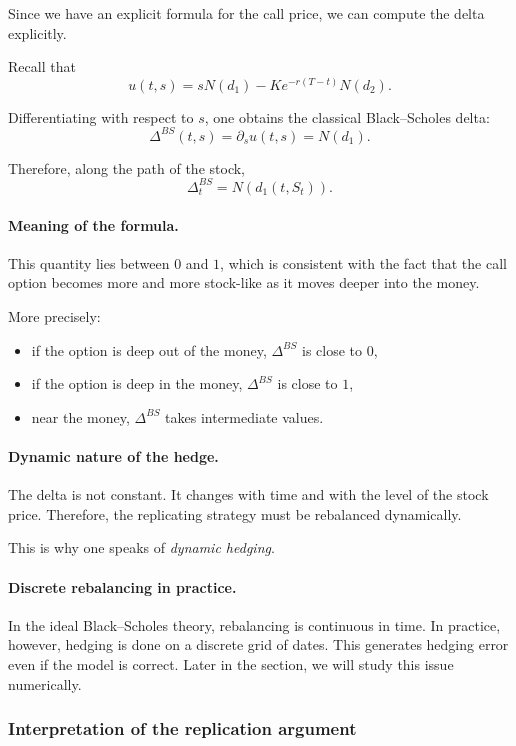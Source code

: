 \documentclass[11pt]{article}
\theoremstyle{plain}
\theoremstyle{definition}
\theoremstyle{remark}
\begin{document}
Since we have an explicit formula for the call price, we can compute the
delta explicitly.

Recall that
\[
u(t,s)=sN(d_1)-Ke^{-r(T-t)}N(d_2).
\]

Differentiating with respect to \(s\), one obtains the classical
Black--Scholes delta:
\[
\boxed{
\Delta^{BS}(t,s)=\partial_s u(t,s)=N(d_1).
}
\]

Therefore, along the path of the stock,
\[
\boxed{
\Delta_t^{BS}=N(d_1(t,S_t)).
}
\]

\paragraph{Meaning of the formula.}
This quantity lies between \(0\) and \(1\), which is consistent with the
fact that the call option becomes more and more stock-like as it moves
deeper into the money.

More precisely:
\begin{itemize}[leftmargin=1.4em]
    \item if the option is deep out of the money, \(\Delta^{BS}\) is
    close to \(0\),
    \item if the option is deep in the money, \(\Delta^{BS}\) is close
    to \(1\),
    \item near the money, \(\Delta^{BS}\) takes intermediate values.
\end{itemize}

\paragraph{Dynamic nature of the hedge.}
The delta is not constant.
It changes with time and with the level of the stock price.
Therefore, the replicating strategy must be rebalanced dynamically.

This is why one speaks of \emph{dynamic hedging}.

\paragraph{Discrete rebalancing in practice.}
In the ideal Black--Scholes theory, rebalancing is continuous in time.
In practice, however, hedging is done on a discrete grid of dates.
This generates hedging error even if the model is correct.
Later in the section, we will study this issue numerically.

\subsubsection{Interpretation of the replication argument}
\end{document}
